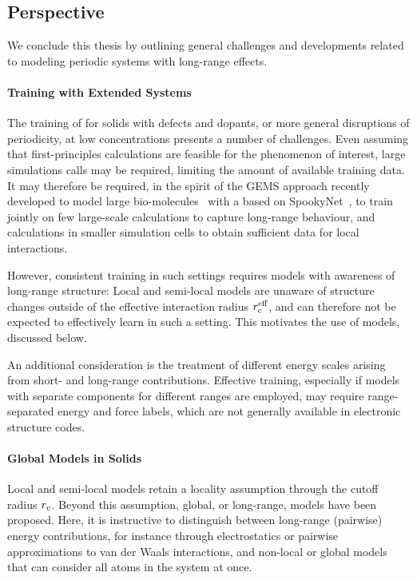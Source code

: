 \subsection{Perspective}

We conclude this thesis by outlining general challenges and developments related to modeling periodic systems with long-range effects.

\paragraph{Training with Extended Systems}
The training of \mlps for solids with defects and dopants, or more general disruptions of periodicity, at low concentrations presents a number of challenges.
Even assuming that first-principles calculations are feasible for the phenomenon of interest, large simulations calls may be required, limiting the amount of available training data.
It may therefore be required, in the spirit of the GEMS approach recently developed to model large bio-molecules~\cite{ustm2022a} with a \mlp based on SpookyNet~\cite{ucsm2021q}, to train jointly on few large-scale  calculations to capture long-range behaviour, and  calculations in smaller simulation cells to obtain sufficient data for local interactions.

However, consistent training in such settings requires models with awareness of long-range structure: Local and semi-local models are unaware of structure changes outside of the effective interaction radius $r_{\text{c}}^{\text{eff}}$, and can therefore not be expected to effectively learn in such a setting. This motivates the use of  models, discussed below.

An additional consideration is the treatment of different energy scales arising from short- and long-range contributions. Effective training, especially if models with separate components for different ranges are employed, may require range-separated energy and force labels, which are not generally available in electronic structure codes.

\paragraph{Global Models in Solids}
 Local and semi-local models retain a locality assumption through the cutoff radius $r_{\text{c}}$.
Beyond this assumption, global, or long-range, models have been proposed. Here, it is instructive to distinguish between long-range (pairwise) energy contributions, for instance through electrostatics or pairwise approximations to van der Waals interactions, and non-local or global models~\cite{ctsm2017q,ucsm2021q,fum2022q} that can consider all atoms in the system at once.

